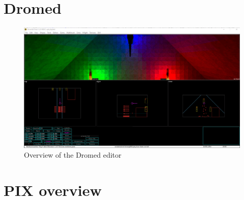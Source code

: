 \begin{appendix} 
 
\clearpage


\section{Dromed} 

\begin{figure}[htbp]
	\centering
		\includegraphics[width=1.00\textwidth]{img/PIX/Dromed_brushes.png}
	\caption[Overview of the Dromed editor]{Overview of the Dromed editor}
	\label{fig:DromedOverview}
\end{figure}

\clearpage
{}
\section{PIX overview} 


\end{appendix}
